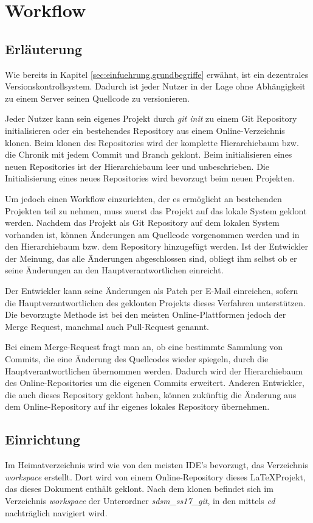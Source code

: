 \section{Workflow}

\subsection{Erläuterung}
Wie bereits in Kapitel \ref*{sec:einfuehrung.grundbegriffe} erwähnt, ist ein dezentrales Versionskontrollsystem. Dadurch ist jeder Nutzer in der Lage ohne Abhängigkeit zu einem Server seinen Quellcode zu versionieren.

Jeder Nutzer kann sein eigenes Projekt durch \textit{git init} zu einem Git Repository initialisieren oder ein bestehendes Repository aus einem Online-Verzeichnis klonen. Beim klonen des Repositories wird der komplette Hierarchiebaum bzw. die Chronik mit jedem Commit und Branch geklont. Beim initialisieren eines neuen Repositories ist der Hierarchiebaum leer und unbeschrieben. Die Initialisierung eines neues Repositories wird bevorzugt beim neuen Projekten.

Um jedoch einen Workflow einzurichten, der es ermöglicht an bestehenden Projekten teil zu nehmen, muss zuerst das Projekt auf das lokale System geklont werden. Nachdem das Projekt als Git Repository auf dem lokalen System vorhanden ist, können Änderungen am Quellcode vorgenommen werden und in den Hierarchiebaum bzw. dem Repository hinzugefügt werden. Ist der Entwickler der Meinung, das alle Änderungen abgeschlossen sind, obliegt ihm selbst ob er seine Änderungen an den Hauptverantwortlichen einreicht. 

Der Entwickler kann seine Änderungen als Patch per E-Mail einreichen, sofern die Hauptverantwortlichen des geklonten Projekts dieses Verfahren unterstützen. Die bevorzugte Methode ist bei den meisten Online-Plattformen jedoch der Merge Request, manchmal auch Pull-Request genannt. 

Bei einem Merge-Request fragt man an, ob eine bestimmte Sammlung von Commits, die eine Änderung des Quellcodes wieder spiegeln, durch die Hauptverantwortlichen übernommen werden. Dadurch wird der Hierarchiebaum des Online-Repositories um die eigenen Commits erweitert. Anderen Entwickler, die auch dieses Repository geklont haben, können zukünftig die Änderung aus dem Online-Repository auf ihr eigenes lokales Repository übernehmen.  

\subsection{Einrichtung}
Im Heimatverzeichnis wird wie von den meisten IDE's bevorzugt, das Verzeichnis \textit{workspace} erstellt. Dort wird von einem Online-Repository dieses \LaTeX Projekt, das dieses Dokument enthält geklont. Nach dem klonen befindet sich im Verzeichnis \textit{workspace} der Unterordner \textit{sdsm\_ss17\_git}, in den mittels \textit{cd} nachträglich navigiert wird.

